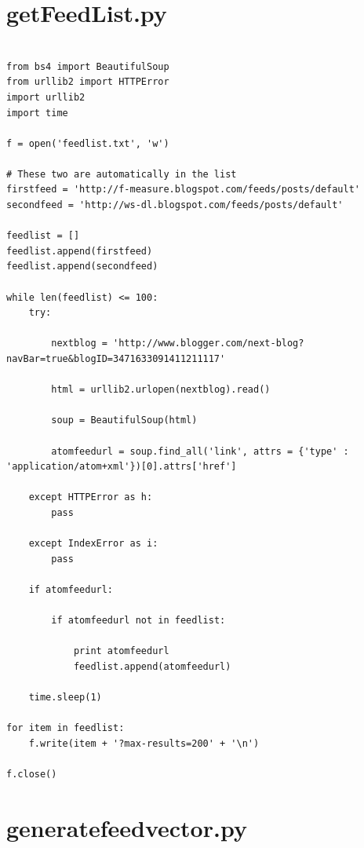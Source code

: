 \documentclass{article}
\begin{document}

\newpage
\appendix

\section{getFeedList.py}

\begin{lstlisting}[frame=single, caption=getFeedList.py, label=getFeedList]

from bs4 import BeautifulSoup
from urllib2 import HTTPError
import urllib2
import time

f = open('feedlist.txt', 'w')

# These two are automatically in the list
firstfeed = 'http://f-measure.blogspot.com/feeds/posts/default'
secondfeed = 'http://ws-dl.blogspot.com/feeds/posts/default'

feedlist = []
feedlist.append(firstfeed)
feedlist.append(secondfeed)

while len(feedlist) <= 100:
    try:

        nextblog = 'http://www.blogger.com/next-blog?navBar=true&blogID=3471633091411211117'

        html = urllib2.urlopen(nextblog).read()

        soup = BeautifulSoup(html)

        atomfeedurl = soup.find_all('link', attrs = {'type' : 'application/atom+xml'})[0].attrs['href']

    except HTTPError as h:
        pass

    except IndexError as i:
        pass

    if atomfeedurl:

        if atomfeedurl not in feedlist:

            print atomfeedurl
            feedlist.append(atomfeedurl)

    time.sleep(1)

for item in feedlist:
    f.write(item + '?max-results=200' + '\n')

f.close()

\end{lstlisting}

\section{generatefeedvector.py}
\end{document}
